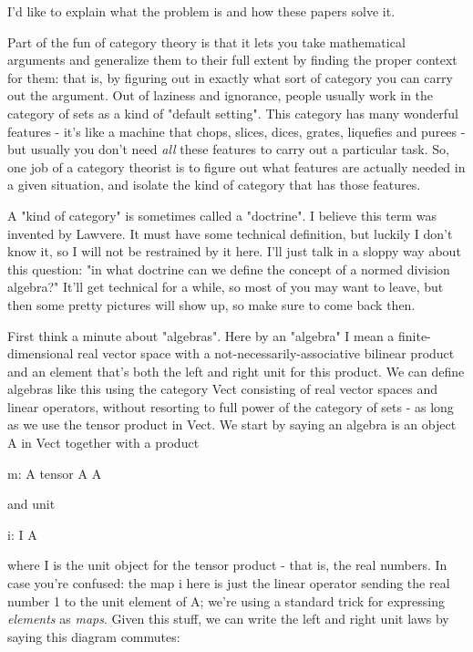 I'd like to explain what the problem is and how these papers solve it.

Part of the fun of category theory is that it lets you take mathematical
arguments and generalize them to their full extent by finding the proper
context for them: that is, by figuring out in exactly what sort of
category you can carry out the argument.  Out of laziness and ignorance,
people usually work in the category of sets as a kind of "default
setting".  This category has many wonderful features - it's like a 
machine that chops, slices, dices, grates, liquefies and purees - but 
usually you don't need \emph{all} these features to carry out a particular
task.  So, one job of a category theorist is to figure out what
features are actually needed in a given situation, and isolate the
kind of category that has those features.  

A "kind of category" is sometimes called a
"doctrine".  I believe this term was invented by Lawvere.  It
must have some technical definition, but luckily I don't know it, so I
will not be restrained by it here.  I'll just talk in a sloppy way about
this question: "in what doctrine can we define the concept of a
normed division algebra?" It'll get technical for a while, so most
of you may want to leave, but then some pretty pictures will show up, so
make sure to come back then.

First think a minute about "algebras".  Here by an
"algebra" I mean a finite-dimensional real vector space with a
not-necessarily-associative bilinear product and an element that's both
the left and right unit for this product.  We can define algebras like
this using the category Vect consisting of real vector spaces and linear
operators, without resorting to full power of the category of sets - as
long as we use the tensor product in Vect.  We start by saying an
algebra is an object A in Vect together with a product

m: A tensor A \to  A

and unit 

i: I \to  A

where I is the unit object for the tensor product - that is, the real 
numbers.  In case you're confused: the map i here is just the linear 
operator sending the real number 1 to the unit element of A; we're using 
a standard trick for expressing \emph{elements} as \emph{maps}.  
Given this stuff,
we can write the left and right unit laws by saying this diagram commutes:


$$

